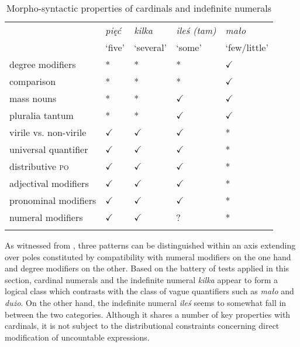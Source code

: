 \documentclass[output=paper,
]{langscibook}
\begin{document}
	\begin{table}[h]
		\centering
		\caption{Morpho-syntactic properties of cardinals and indefinite numerals}
		\label{table:morpho-syntactic-properties-of-cardinals-and-indefinite-numerals}
		\begin{tabularx}{0.9\textwidth}{@{}lXXXX@{}}
			\lsptoprule
			\multirow{2}{*}{}          & \multicolumn{1}{l}{\textit{pięć}} & \multicolumn{1}{l}{\textit{kilka}} & \multicolumn{1}{l}{\textit{ileś (tam)}} & \multicolumn{1}{l}{\textit{mało}}  \\
			& \multicolumn{1}{l}{\small{`five'}}      & \multicolumn{1}{l}{\small{`several'}}    & \multicolumn{1}{l}{\small{`some'}}            & \multicolumn{1}{l}{\small{`few/little'}} \\ 
\midrule
degree modifiers     & * & * & *  & $\checkmark$  \\
comparison   & * & *  & *  & $\checkmark$   \\
mass nouns   & *  & * & $\checkmark$  & $\checkmark$ \\
pluralia tantum & * & * & $\checkmark$ & $\checkmark$ \\
virile vs. non-virile & $\checkmark$ & $\checkmark$ & $\checkmark$ & * \\
universal quantifier & $\checkmark$ & $\checkmark$ & $\checkmark$ & * \\
distributive \textsc{po} & $\checkmark$ & $\checkmark$ & $\checkmark$ & *\\
adjectival modifiers  & $\checkmark$ & $\checkmark$ & $\checkmark$ & * \\
pronominal modifiers & $\checkmark$ & $\checkmark$ & $\checkmark$ & * \\
numeral modifiers & $\checkmark$ & $\checkmark$ & ? & * \\ 
\lspbottomrule
\end{tabularx}
\end{table}
	
	\normalsize
	
	As witnessed from , three patterns can be distinguished within an axis extending over poles constituted by compatibility with numeral modifiers on the one hand and degree modifiers on the other. Based on the battery of tests applied in this section, cardinal numerals and the indefinite numeral \textit{kilka} appear to form a logical class which contrasts with the class of vague quantifiers such as \textit{mało} and \textit{dużo}. On the other hand, the indefinite numeral \textit{ileś} seems to somewhat fall in between the two categories. Although it shares a number of key properties with cardinals, it is not subject to the distributional constraints concerning direct modification of uncountable expressions. 
	
\end{document}
